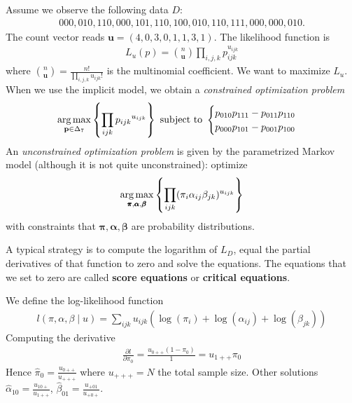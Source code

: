 \documentclass[a4paper, 11pt]{article}
\begin{document}
Assume we observe the following data \( D \):
\begin{align*}
  000, 010, 110, 000, 101, 110, 100, 010, 110, 111, 000, 000, 010.
\end{align*}
The count vector reads \( \mathbf u = (4,0,3,0,1,1,3,1) \). The likelihood function is
\begin{align*}
  L_{u}(p) = {n \choose \mathbf u} \prod_{i,j,k}p_{ijk}^{u_{ijk}}
\end{align*}
where \( {n \choose \mathbf u} = \frac{n!}{\prod_{i,j,k} u_{ijk}!} \) is the multinomial coefficient. We want to maximize \( L_u \). When we use the implicit model, we obtain a \emph{constrained optimization problem} 
\begin{align*}
  \operatorname*{arg\,max}_{\mathbf p \in \Delta_7}\left \{\prod_{ijk}{p_{ijk}}^{u_{ijk}}\right \} \text{ subject to } \begin{cases}
    p_{010}p_{111} - p_{011} p_{110}  \\
    p_{000}p_{101} - p_{001}p_{100} 
  \end{cases}
\end{align*}
An \emph{unconstrained optimization problem} is given by the parametrized Markov model (although it is not quite unconstrained): optimize 
\begin{align*}
  \operatorname*{arg\,max}_{\pmb \pi, \pmb \alpha, \pmb \beta} \left\{ \prod_{ijk} (\pi_i \alpha_{ij} \beta_{jk})^{u_{ijk}} \right\}
\end{align*}
with constraints that \( \pmb \pi, \pmb \alpha, \pmb \beta \) are probability distributions.

A typical strategy is to compute the logarithm of \( L_D \), equal the partial derivatives of that function to zero and solve the equations. The equations that we set to zero are called \textbf{score equations} or \textbf{critical equations}.


We define the log-likelihood function 
\begin{align*}
  l(\pi, \alpha, \beta \mid u) = \sum_{ijk}u_{ijk} ( \log(\pi_i) + \log(\alpha_{ij}) + \log(\beta_{jk})) 
\end{align*}
Computing the derivative
\begin{align*}
  \frac{\partial l}{\partial \pi_0} = \frac{u_{0++} (1 - \pi_0)}{1} = u_{1++}\pi_0
\end{align*}
Hence \( \hat \pi_0 = \frac{u_{0++}}{u_{+++}} \) where \( u_{+++} = N \) the total sample size. Other solutions \( \hat \alpha_{10} = \frac{u_{10+}}{u_{1++}} \), \( \hat \beta_{01} = \frac{u_{+01}}{u_{+0+}} \).
\end{document}
